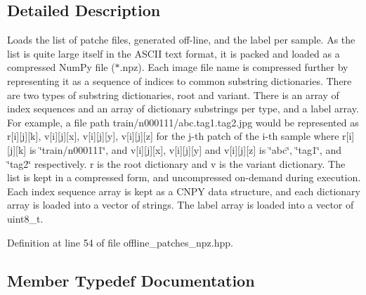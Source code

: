 \subsection{Detailed Description}
Loads the list of patche files, generated off-\/line, and the label per sample. As the list is quite large itself in the A\+S\+C\+II text format, it is packed and loaded as a compressed Num\+Py file ($\ast$.npz). Each image file name is compressed further by representing it as a sequence of indices to common substring dictionaries. There are two types of substring dictionaries, root and variant. There is an array of index sequences and an array of dictionary substrings per type, and a label array. For example, a file path train/n000111/abc.\+tag1.\+tag2.\+jpg would be represented as \textquotesingle{}r\mbox{[}i\mbox{]}\mbox{[}j\mbox{]}\mbox{[}k\mbox{]}\textquotesingle{}, \textquotesingle{}v\mbox{[}i\mbox{]}\mbox{[}j\mbox{]}\mbox{[}x\mbox{]}\textquotesingle{}, \textquotesingle{}v\mbox{[}i\mbox{]}\mbox{[}j\mbox{]}\mbox{[}y\mbox{]}\textquotesingle{}, \textquotesingle{}v\mbox{[}i\mbox{]}\mbox{[}j\mbox{]}\mbox{[}z\mbox{]}\textquotesingle{} for the j-\/th patch of the i-\/th sample where \textquotesingle{}r\mbox{[}i\mbox{]}\mbox{[}j\mbox{]}\mbox{[}k\mbox{]}\textquotesingle{} is \char`\"{}train/n000111\char`\"{}, and \textquotesingle{}v\mbox{[}i\mbox{]}\mbox{[}j\mbox{]}\mbox{[}x\mbox{]}\textquotesingle{}, \textquotesingle{}v\mbox{[}i\mbox{]}\mbox{[}j\mbox{]}\mbox{[}y\mbox{]}\textquotesingle{} and \textquotesingle{}v\mbox{[}i\mbox{]}\mbox{[}j\mbox{]}\mbox{[}z\mbox{]}\textquotesingle{} is \char`\"{}abc\char`\"{}, \char`\"{}tag1\char`\"{}, and \char`\"{}tag2\char`\"{} respectively. \textquotesingle{}r\textquotesingle{} is the root dictionary and \textquotesingle{}v\textquotesingle{} is the variant dictionary. The list is kept in a compressed form, and uncompressed on-\/demand during execution. Each index sequence array is kept as a C\+N\+PY data structure, and each dictionary array is loaded into a vector of strings. The label array is loaded into a vector of uint8\+\_\+t. 

Definition at line 54 of file offline\+\_\+patches\+\_\+npz.\+hpp.



\subsection{Member Typedef Documentation}
\mbox{\label{classlbann_1_1offline__patches__npz_ae0ed6bf62b2be1814964206522ed4e05}} 
